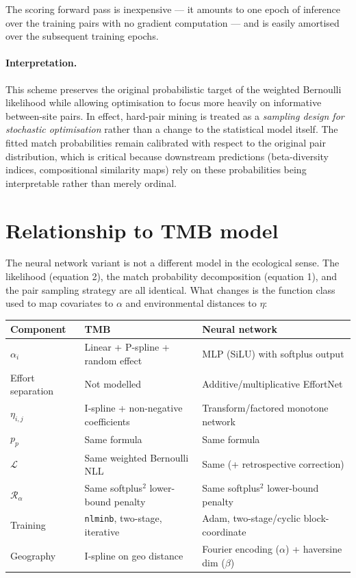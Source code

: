 \documentclass{article}
\begin{document}
The scoring forward pass is inexpensive --- it amounts to one epoch of inference over the training pairs with no gradient computation --- and is easily amortised over the subsequent training epochs.

\paragraph{Interpretation.}
This scheme preserves the original probabilistic target of the weighted Bernoulli likelihood while allowing optimisation to focus more heavily on informative between-site pairs. In effect, hard-pair mining is treated as a \emph{sampling design for stochastic optimisation} rather than a change to the statistical model itself. The fitted match probabilities remain calibrated with respect to the original pair distribution, which is critical because downstream predictions (beta-diversity indices, compositional similarity maps) rely on these probabilities being interpretable rather than merely ordinal.

\section{Relationship to TMB model}

The neural network variant is not a different model in the ecological sense. The likelihood (equation 2), the match probability decomposition (equation 1), and the pair sampling strategy are all identical. What changes is the function class used to map covariates to $\alpha$ and environmental distances to $\eta$:

\begin{center}
\begin{tabular}{l|l|l}
    Component & TMB & Neural network \\
    \hline
    $\alpha_i$ & Linear + P-spline + random effect & MLP (SiLU) with softplus output \\
    Effort separation & Not modelled & Additive/multiplicative EffortNet \\
    $\eta_{i,j}$ & I-spline + non-negative coefficients & Transform/factored monotone network \\
    $p_p$ & Same formula & Same formula \\
    $\mathcal{L}$ & Same weighted Bernoulli NLL & Same (+ retrospective correction) \\
    $\mathcal{R}_\alpha$ & Same softplus$^2$ lower-bound penalty & Same softplus$^2$ lower-bound penalty \\
    Training & \texttt{nlminb}, two-stage, iterative & Adam, two-stage/cyclic block-coordinate \\
    Geography & I-spline on geo distance & Fourier encoding ($\alpha$) + haversine dim ($\beta$) \\
\end{tabular}
\end{center}
\end{document}

